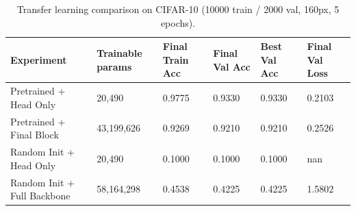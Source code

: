 \begin{table}
\caption{Transfer learning comparison on CIFAR-10 (10000 train / 2000 val, 160px, 5 epochs).}
\label{tab:task1_4}
\begin{tabular}{llllll}
\toprule
Experiment & Trainable params & Final Train Acc & Final Val Acc & Best Val Acc & Final Val Loss \\
\midrule
Pretrained + Head Only & 20,490 & 0.9775 & 0.9330 & 0.9330 & 0.2103 \\
Pretrained + Final Block & 43,199,626 & 0.9269 & 0.9210 & 0.9210 & 0.2526 \\
Random Init + Head Only & 20,490 & 0.1000 & 0.1000 & 0.1000 & nan \\
Random Init + Full Backbone & 58,164,298 & 0.4538 & 0.4225 & 0.4225 & 1.5802 \\
\bottomrule
\end{tabular}
\end{table}
